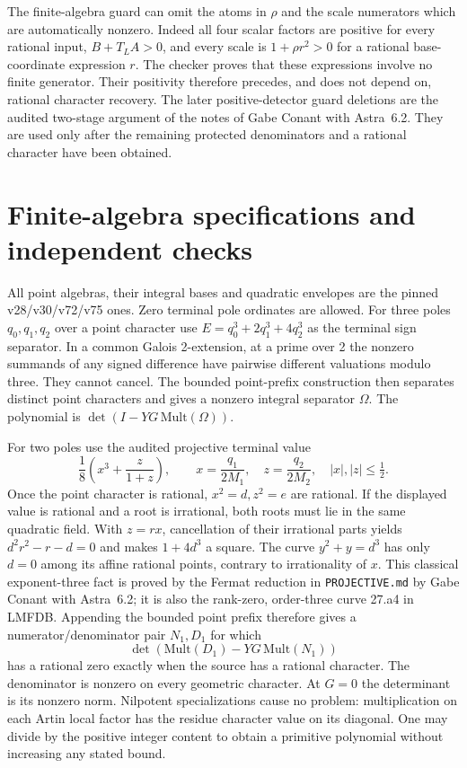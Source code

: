 \documentclass[11pt]{article}
\begin{document}
The finite-algebra guard can omit the atoms in $\rho$ and the scale
numerators which are automatically nonzero. Indeed all four scalar
factors are positive for every rational input, $B+T_LA>0$, and every
scale is $1+\rho r^2>0$ for a rational base-coordinate expression $r$.
The checker proves that these expressions involve no finite generator.
Their positivity therefore precedes, and does not depend on, rational
character recovery. The later positive-detector guard deletions are
the audited two-stage argument of the notes of Gabe Conant with Astra~6.2. They are used
only after the remaining protected denominators and a rational character
have been obtained.

\section{Finite-algebra specifications and independent checks}

All point algebras, their integral bases and quadratic envelopes are
the pinned v28/v30/v72/v75 ones. Zero terminal pole ordinates are
allowed. For three poles $q_0,q_1,q_2$ over a point character use
$E=q_0^3+2q_1^3+4q_2^3$ as the terminal sign separator. In a common
Galois 2-extension, at a prime over 2 the nonzero summands of any
signed difference have pairwise different valuations modulo three.
They cannot cancel. The bounded point-prefix construction then
separates distinct point characters and gives a nonzero integral
separator $\Omega$. The polynomial is $\det(I-YG\,\mathrm{Mult}(\Omega))$.

For two poles use the audited projective terminal value
\[
 \frac18\left(x^3+\frac{z}{1+z}\right),\qquad
 x=\frac{q_1}{2M_1},\quad z=\frac{q_2}{2M_2},\quad |x|,|z|\le\tfrac12.
\]
Once the point character is rational, $x^2=d,z^2=e$ are rational.
If the displayed value is rational and a root is irrational, both
roots must lie in the same quadratic field. With $z=rx$, cancellation
of their irrational parts yields $d^2r^2-r-d=0$ and makes
$1+4d^3$ a square. The curve $y^2+y=d^3$ has only $d=0$ among its
affine rational points, contrary to irrationality of $x$.
This classical exponent-three fact is proved by the Fermat reduction
in \texttt{PROJECTIVE.md} by Gabe Conant with Astra~6.2; it is also the rank-zero,
order-three curve 27.a4 in LMFDB. Appending the bounded point prefix
therefore gives a numerator/denominator pair $N_1,D_1$ for which
\[
 \det(\mathrm{Mult}(D_1)-YG\,\mathrm{Mult}(N_1))
\]
has a rational zero exactly when the source has a rational character.
The denominator is nonzero on every geometric character. At $G=0$
the determinant is its nonzero norm. Nilpotent specializations cause
no problem: multiplication on each Artin local factor has the residue
character value on its diagonal. One may divide by the positive
integer content to obtain a primitive polynomial without increasing
any stated bound.
\end{document}
